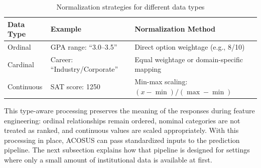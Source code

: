 \documentclass[letterpaper,11pt]{article}
\begin{document}
\begin{table}[htbp]
\centering
\caption{Normalization strategies for different data types}
\label{tab:normalization}
\begin{tabular}{@{}lll@{}}
\toprule
\textbf{Data Type} & \textbf{Example} & \textbf{Normalization Method} \\
\midrule
Ordinal & GPA range: ``3.0--3.5'' & Direct option weightage (e.g., 8/10) \\
Cardinal & Career: ``Industry/Corporate'' & Equal weightage or domain-specific mapping \\
Continuous & SAT score: 1250 & Min-max scaling: $(x - \min)/(\max - \min)$ \\
\bottomrule
\end{tabular}
\end{table}

This type-aware processing preserves the meaning of the responses during feature engineering: ordinal relationships remain ordered, nominal categories are not treated as ranked, and continuous values are scaled appropriately. With this processing in place, ACOSUS can pass standardized inputs to the prediction pipeline. The next subsection explains how that pipeline is designed for settings where only a small amount of institutional data is available at first.
\end{document}
